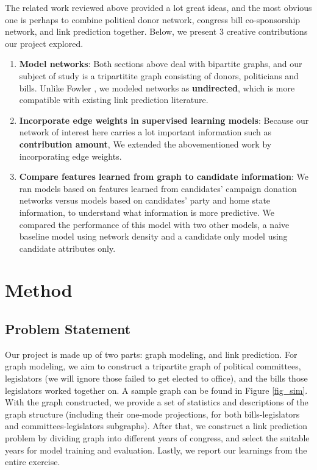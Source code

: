 \documentclass[12pt,twocolumn]{article}
\begin{document}
The related work reviewed above provided a lot great ideas, and the most obvious one is perhaps to combine political donor network, congress bill co-sponsorship network, and link prediction together. Below, we present 3 creative contributions our project explored. 
\begin{enumerate}
\item \textbf{Model networks}: Both sections above deal with bipartite graphs, and our subject of study is a tripartitite graph consisting of donors, politicians and bills. Unlike Fowler \cite{fowler2006connecting}, we modeled networks as \textbf{undirected}, which is more compatible with existing link prediction literature. 
\item \textbf{Incorporate edge weights in supervised learning models}: Because our network of interest here carries a lot important information such as \textbf{contribution amount}, We extended the abovementioned work by incorporating edge weights.  
\item \textbf{Compare features learned from graph to candidate information}: We ran models based on features learned from candidates' campaign donation networks versus models based on candidates' party and home state information, to understand what information is more predictive.  We compared the performance of this model with two other models, a naive baseline model using network density and a candidate only model using candidate attributes only.
\end{enumerate}

\section{Method}
\subsection{Problem Statement}
Our project is made up of two parts: graph modeling, and link prediction. For graph modeling, we aim to construct a tripartite graph of political committees, legislators (we will ignore those failed to get elected to office), and the bills those legislators worked together on. A sample graph can be found in Figure \ref{fig_sim}. With the graph constructed, we provide a set of statistics and descriptions of the graph structure (including their one-mode projections, for both bills-legislators and committees-legislators subgraphs). After that, we construct a link prediction problem by dividing graph into different years of congress, and select the suitable years for model training and evaluation. Lastly, we report our learnings from the entire exercise. 
\end{document}
